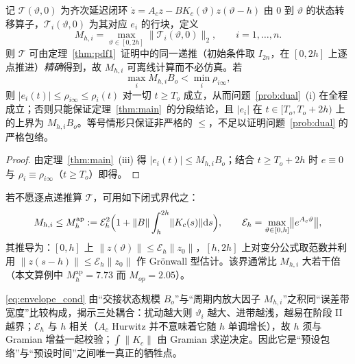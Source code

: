\begin{proposition}[阶段 II 包络判据]\label{prop:stage2}
记 \(\mathcal T(\vartheta,0)\) 为齐次延迟闭环 \(\dot z=A_cz-BK_c(\vartheta)z(\vartheta-h)\) 由 \(0\) 到 \(\vartheta\) 的状态转移算子，\(\mathcal T_i(\vartheta,0)\) 为其对应 \(e_i\) 的行块，定义
\begin{equation}
M_{h,i}=\max_{\vartheta\in[0,2h]}\bigl\lVert\mathcal T_i(\vartheta,0)\bigr\rVert_2,\qquad i=1,\dots,n .
\label{eq:Mh}
\end{equation}
则 \(\mathcal T\) 可由定理~\ref{thm:pdf1}~证明中的同一递推（初始条件取 \(I_{2n}\)，在 \([0,2h]\) 上逐点推进）\emph{精确}得到，故 \(M_{h,i}\) 可离线计算而不必仿真。若
\begin{equation}
\max_{i}M_{h,i}B_o<\min_{i}\rho_{i\infty},
\label{eq:envelope_cond}
\end{equation}
则 \(\lvert e_i(t)\rvert\le\rho_{i\infty}\le\rho_i(t)\) 对一切 \(t\ge T_o\) 成立，从而问题~\ref{prob:dual}~(i) 在全程成立；否则只能保证定理~\ref{thm:main}~的分段结论，且 \(|e_i|\) 在 \(t\in[T_o,T_o+2h)\) 上的上界为 \(M_{h,i}B_o\)。等号情形只保证非严格的 \(\le\)，不足以证明问题~\ref{prob:dual} 的严格包络。
\end{proposition}

\begin{proof}
由定理~\ref{thm:main}~(iii) 得 \(\lvert e_i(t)\rvert\le M_{h,i}B_o\)；结合 \(t\ge T_o+2h\) 时 \(e\equiv0\) 与 \(\rho_i\equiv\rho_{i\infty}\)（\(t\ge T_o\)）即得。
\end{proof}

\begin{remark}[闭式先验上界]\label{rem:Mh_apriori}
若不愿逐点递推算 \(\mathcal T\)，可用如下闭式界代之：
\begin{equation}
M_{h,i}\le M_h^{\mathrm{ap}}:=\mathcal E_h^{2}\Bigl(1+\lVert B\rVert\int_h^{2h}\lVert K_c(s)\rVert\mathrm{d} s\Bigr),
\qquad \mathcal E_h=\max_{\vartheta\in[0,h]}\bigl\lVert e^{A_c\vartheta}\bigr\rVert ,
\label{eq:Mh_ap}
\end{equation}
其推导为：\([0,h]\) 上 \(\lVert z(\vartheta)\rVert\le\mathcal E_h\lVert z_0\rVert\)，\([h,2h]\) 上对变分公式取范数并利用 \(\lVert z(s-h)\rVert\le\mathcal E_h\lVert z_0\rVert\) 作 Grönwall 型估计。该界通常比 \(M_{h,i}\) 大若干倍（本文算例中 \(M_h^{\mathrm{ap}}=7.73\) 而 \(M_{op}=2.05\)）。
\end{remark}

\begin{remark}[判据的结构含义]\label{rem:envelope_cond}
\eqref{eq:envelope_cond} 由“交接状态规模 \(B_o\)”与“周期内放大因子 \(M_{h,i}\)”之积同“误差带宽度”比较构成，揭示三处耦合：扰动越大则 \(\vartheta_i\) 越大、进带越浅，越易在阶段 II 越界；\(\mathcal E_h\) 与 \(h\) 相关（\(A_c\) Hurwitz 并不意味着它随 \(h\) 单调增长），故 \(h\) 须与 Gramian 增益一起校验；\(\int\lVert K_c\rVert\) 由 Gramian 求逆决定。因此它是“预设包络”与“预设时间”之间唯一真正的牺牲点。
\end{remark}

